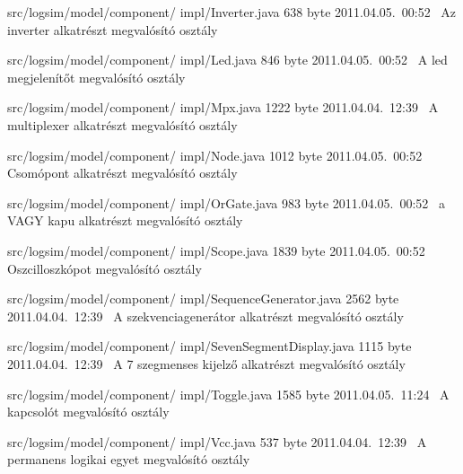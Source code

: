 \begin{fajllista}
\fajl
{src/logsim/model/component/\newline
impl/Inverter.java} %
{638 byte} %
{2011.04.05.~00:52~} %
{Az inverter alkatrészt megvalósító osztály} %

\fajl
{src/logsim/model/component/\newline
impl/Led.java} %
{846 byte} %
{2011.04.05.~00:52~} %
{A led megjelenítőt megvalósító osztály} %

\fajl
{src/logsim/model/component/\newline
impl/Mpx.java} %
{1222 byte} %
{2011.04.04.~12:39~} %
{A multiplexer alkatrészt megvalósító osztály} %

\fajl
{src/logsim/model/component/\newline
impl/Node.java} %
{1012 byte} %
{2011.04.05.~00:52~} %
{Csomópont alkatrészt megvalósító osztály} %

\fajl
{src/logsim/model/component/\newline
impl/OrGate.java} %
{983 byte} %
{2011.04.05.~00:52~} %
{a VAGY kapu alkatrészt megvalósító osztály} %

\fajl
{src/logsim/model/component/\newline
impl/Scope.java} %
{1839 byte} %
{2011.04.05.~00:52~} %
{Oszcilloszkópot megvalósító osztály} %

\fajl
{src/logsim/model/component/\newline
impl/SequenceGenerator.java} %
{2562 byte} %
{2011.04.04.~12:39~} %
{A szekvenciagenerátor alkatrészt megvalósító osztály} %

\fajl
{src/logsim/model/component/\newline
impl/SevenSegmentDisplay.java} %
{1115 byte} %
{2011.04.04.~12:39~} %
{A 7 szegmenses kijelző alkatrészt megvalósító osztály} %

\fajl
{src/logsim/model/component/\newline
impl/Toggle.java} %
{1585 byte} %
{2011.04.05.~11:24~} %
{A kapcsolót megvalósító osztály} %

\fajl
{src/logsim/model/component/\newline
impl/Vcc.java} %
{537 byte} %
{2011.04.04.~12:39~} %
{A permanens logikai egyet megvalósító osztály} %


\end{fajllista}
